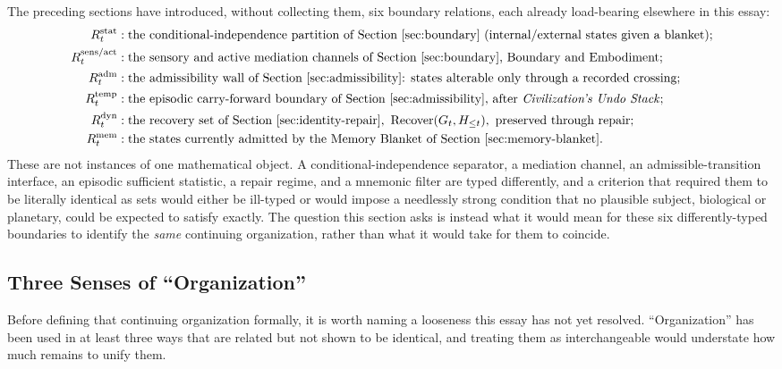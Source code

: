 \documentclass[11pt]{article}
\newcommand{\Recover}{\operatorname{Recover}}
\begin{document}
The preceding sections have introduced, without collecting them, six boundary relations, each already load-bearing elsewhere in this essay:
\begin{align*}
R^{\mathrm{stat}}_t &: \text{the conditional-independence partition of Section~\ref{sec:boundary} (internal/external states given a blanket);}\\
R^{\mathrm{sens/act}}_t &: \text{the sensory and active mediation channels of Section~\ref{sec:boundary}, Boundary and Embodiment;}\\
R^{\mathrm{adm}}_t &: \text{the admissibility wall of Section~\ref{sec:admissibility}: states alterable only through a recorded crossing;}\\
R^{\mathrm{temp}}_t &: \text{the episodic carry-forward boundary of Section~\ref{sec:admissibility}, after \emph{Civilization's Undo Stack};}\\
R^{\mathrm{dyn}}_t &: \text{the recovery set of Section~\ref{sec:identity-repair}, } \Recover(G_t,H_{\leq t}), \text{ preserved through repair;}\\
R^{\mathrm{mem}}_t &: \text{the states currently admitted by the Memory Blanket of Section~\ref{sec:memory-blanket}.}
\end{align*}
These are not instances of one mathematical object. A conditional-independence separator, a mediation channel, an admissible-transition interface, an episodic sufficient statistic, a repair regime, and a mnemonic filter are typed differently, and a criterion that required them to be literally identical as sets would either be ill-typed or would impose a needlessly strong condition that no plausible subject, biological or planetary, could be expected to satisfy exactly. The question this section asks is instead what it would mean for these six differently-typed boundaries to identify the \emph{same} continuing organization, rather than what it would take for them to coincide.

\subsection{Three Senses of ``Organization''}
\label{sec:organization-senses}

Before defining that continuing organization formally, it is worth naming a looseness this essay has not yet resolved. ``Organization'' has been used in at least three ways that are related but not shown to be identical, and treating them as interchangeable would understate how much remains to unify them.
\end{document}
